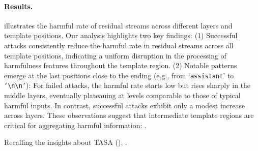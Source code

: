 \paragraph{Results.}
 illustrates the harmful rate of residual streams across different layers and template positions. Our analysis highlights two key findings:
(1) Successful attacks consistently reduce the harmful rate in residual streams across all template positions, indicating a uniform disruption in the processing of harmfulness features throughout the template region.
(2) Notable patterns emerge at the last positions close to the ending (e.g., from `\texttt{assistant}' to \texttt{`\texttt{\textbackslash n\textbackslash n}'}): For failed attacks, the harmful rate starts low but rises sharply in the middle layers, eventually plateauing at levels comparable to those of typical harmful inputs. In contrast, successful attacks exhibit only a modest increase across layers.
These observations suggest that intermediate template regions are critical for aggregating harmful information: .

Recalling the insights about TASA (), .
